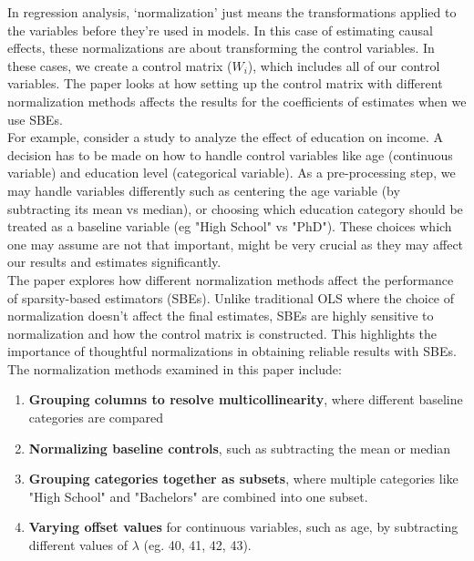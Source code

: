 In regression analysis, `normalization' just means the transformations applied to the variables before they're used in models. In this case of estimating causal effects, these normalizations are about transforming the control variables. In these cases, we create a control matrix ($W_i$), which includes all of our control variables. The paper looks at how setting up the control matrix with different normalization methods affects the results for the coefficients of estimates when we use SBEs. \\

For example, consider a study to analyze the effect of education on income. A decision has to be made on how to handle control variables like age (continuous variable) and education level (categorical variable). As a pre-processing step, we may handle variables differently such as centering the age variable (by subtracting its mean vs median), or choosing which education category should be treated as a baseline variable (eg "High School" vs "PhD"). These choices which one may assume are not that important, might be very crucial as they may affect our results and estimates significantly. \\

The paper explores how different normalization methods affect the performance of sparsity-based estimators (SBEs). Unlike traditional OLS where the choice of normalization doesn't affect the final estimates, SBEs are highly sensitive to normalization and how the control matrix is constructed.  This highlights the importance of thoughtful normalizations in obtaining reliable results with SBEs.\\

The normalization methods examined in this paper include:
\begin{enumerate}
    \item \textbf{Grouping columns to resolve multicollinearity}, where different baseline categories are compared
    \item \textbf{Normalizing baseline controls}, such as subtracting the mean or median 
    \item \textbf{Grouping categories together as subsets}, where multiple categories like "High School" and "Bachelors" are combined into one subset. 
    \item \textbf{Varying offset values} for continuous variables, such as age, by subtracting different values of $\lambda$ (eg. 40, 41, 42, 43).
    
\end{enumerate}

